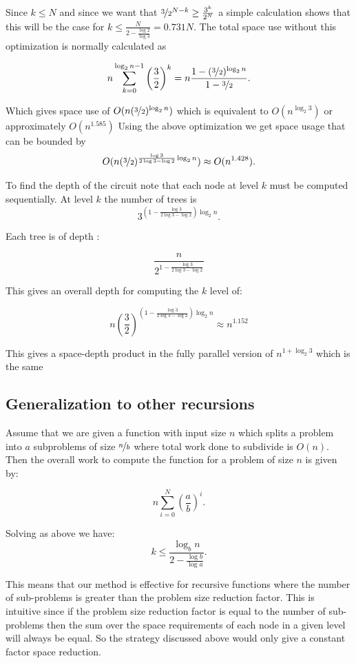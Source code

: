 Since $k\leq N$ and since we want that $\nicefrac{3}{2}^{N-k} \geq
\frac{3^k}{2^N}$ a simple calculation shows that this will be the case for $k
\leq \frac{N}{ 2- \frac{\log 2}{\log 3}} = 0.731N$. The total space use without
this optimization is normally calculated as

\[
    n\sum_{k=0}^{\log_2 n - 1} \left(\frac{3}{2}\right)^k = n\frac{1-(\nicefrac{3}{2})^{\log_2 n}}{1-\nicefrac{3}{2}}.
\]

Which gives space use of $O(n(\nicefrac{3}{2})^{\log_2 n})$ which is
equivalent to $O(n^{\log_2 3})$ or approximately $O(n^{1.585})$
Using the above optimization we get space usage that can be bounded by
\[
    O(n(\nicefrac{3}{2})^{\frac{\log 3}{ 2\log 3 - \log 2}\log_2 n}) \approx O(n^{1.428}).
\]

To find the depth of the circuit note that each node at level $k$ must be
computed sequentially. At level $k$ the number of trees is
\[
    3^{\left(1-\frac{\log 3}{ 2\log 3 - \log 2}\right)\log_2 n}.
\]

Each tree is of depth :

\[
    \frac{n}{2^{1-\frac{\log 3}{ 2\log 3 - \log 2}}}
\]

This gives an overall depth for computing the $k$ level of:

\[
    n\left(\frac{3}{2}\right)^{\left(1-\frac{\log 3}{ 2\log 3 - \log 2}\right)\log_2 n} \approx n^{1.152}
\]

This gives a space-depth product in the fully parallel version of $n^{1+\log_2
3}$ which is the same

\subsection{Generalization to other recursions}

Assume that we are given a function with input size $n$ which splits a problem
into $a$ subproblems of size $\nicefrac{n}{b}$ where total work done to
subdivide is $O(n)$. Then the overall work to compute the function for a
problem of size $n$ is given by:

\[
    n\sum_{i=0}^{N} \left(\frac{a}{b}\right)^i.
\]

Solving as above we have:
\[
    k \leq \frac{\log_b n}{ 2- \frac{\log b}{\log a}}.
\]

This means that our method is effective for recursive functions where the
number of sub-problems is greater than the problem size reduction factor. This
is intuitive since if the problem size reduction factor is equal to the number
of sub-problems then the sum over the space requirements of each node in a
given level will always be equal. So the strategy discussed above would only
give a constant factor space reduction.


